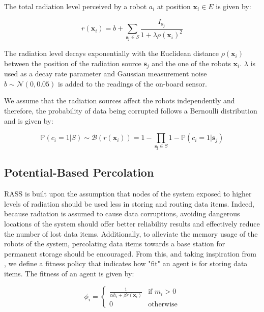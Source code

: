 The total radiation level perceived by a robot $a_i$ at position $\bm{x}_i \in E$ is given by:

\begin{equation}
    r(\bm{x}_i) = b + \sum_{\bm{s_j} \in S} \frac{I_{\bm{s_j}}}{1 + \lambda\rho(\bm{x}_i)^2}
    \label{eq:radiationRASS}
\end{equation}

The radiation level decays exponentially with the Euclidean distance $\rho(\bm{x}_i)$ between the position of the radiation source $\bm{s}_j$ and the one of the robots $\bm{x}_i$. $\lambda$ is used as a decay rate parameter and Gaussian measurement noise
$b \sim \mathcal{N}(0, 0.05)$ is added to the readings of the on-board sensor. 

We assume that the radiation sources affect the robots independently and therefore, the probability of data being corrupted follows a Bernoulli distribution and is given by:

\begin{equation}
    \mathbb{P}(c_i = 1 | S) \sim \mathcal{B}(r(\bm{x}_i)) = 1 - \prod_{\bm{s_j} \in S} 1 - \mathbb{P}(c_i = 1 | \bm{s}_j)
    \label{eq:failureRASS}
\end{equation}


\subsection{Potential-Based Percolation}

RASS is built upon the assumption that nodes of the system exposed to higher levels of radiation should be used less in storing and routing data items. Indeed, because radiation is assumed to cause data corruptions, avoiding dangerous locations of the system should offer better reliability results and effectively reduce the number of lost data items. Additionally, to alleviate the memory usage of the robots of the system, percolating data items towards a base station for permanent storage should be encouraged. From this, and taking inspiration from \cite{majcherczykSwarmmesh2020}, we define a fitness policy that indicates how "fit" an agent is for storing data items. The fitness of an agent is given by:

\begin{equation}
        \phi_i =
        \left\{ 
        \begin{array}{ll}
            \frac{1}{\alpha h_i + \beta r({\bm{x}_i})} &\text{if } m_i > 0 \\
            0 &\text{otherwise}
        \end{array} \right.
        \label{equation:fitness}
\end{equation}

